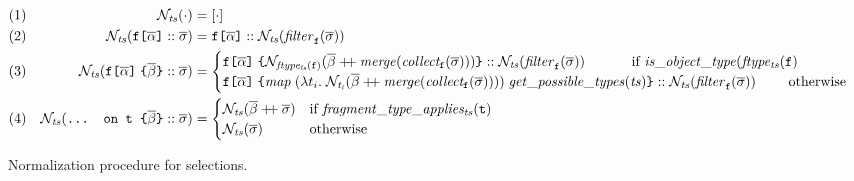 \begin{figure*}[t]
\small
    \centering
    \begin{align*}
    & (1) & \tnorm{\cdot} &= [\cdot] \\
    & (2) & \tnorm{\fld :: \sset} &= 
       	\fld :: \tnorm{\filter{\sset}{\fkey}} \\      
    & (3) & \tnorm{\nfld{\overline{\beta}} :: \sset} &=
    \begin{cases}
        \nfld{\norm{ftype_{ts}(\fkey)}{\overline{\beta} \mdoubleplus \mathit{merge (collect_\fkey (\sset))}}} :: \tnorm{\filter{\sset}{\fkey}} \quad\quad\quad \text{ if } 
	            \mathit{is\_object\_type (ftype_{ts} (\fkey)}\\
    \nfld{\mathit{map}\; (\lambda t_{i}.\; \norm{t_{i}}{\overline{\beta} \mdoubleplus \mathit{merge (collect_{\fkey} (\sset))}})\; \mathit{get\_possible\_types (ts)}} :: \tnorm{\filter{\sset}{\fkey}} \quad\quad \text{ otherwise } 
    \end{cases}\\
    & (4) & \tnorm{\ifrag{t}{\overline{\beta}} :: \sset} &= 
    \begin{cases}
    \tnorm{\overline{\beta} \mdoubleplus \sset} & 
    \text{if }\mathit{fragment\_type\_applies_{ts}(\texttt{t})}\\
    \tnorm{\sset} & \text{otherwise}
    \end{cases}
    \end{align*}
    \caption{Normalization procedure for \gql selections. 
    }
\label{fig:normalize}
\end{figure*}

